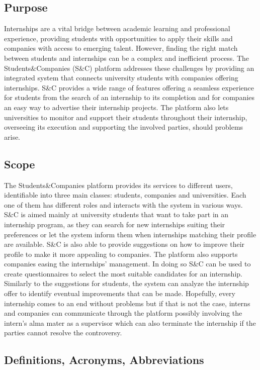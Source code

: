 \subsection{Purpose}
Internships are a vital bridge between academic learning and professional experience, providing students with opportunities to apply their skills and companies with access to emerging talent. However, finding the right match between students and internships can be a complex and inefficient process. The Students\&Companies (S\&C) platform addresses these challenges by providing an integrated system that connects university students with companies offering internships. S\&C provides a wide range of features offering a seamless experience for students from the search of an internship to its completion and for companies an easy way to advertise their internship projects. The platform also lets universities to monitor and support their students throughout their internship, overseeing its execution and supporting the involved parties, should problems arise.
\subsection{Scope}
The Students\&Companies platform provides its services to different users, identifiable into three main classes: students,  companies and universities. Each one of them has different roles and interacts with the system in various ways.
S\&C is aimed mainly at university students that want to take part in an internship program, as they can search for new internships suiting their preferences or let the system inform them when internships matching their profile are available. S\&C is also able to provide suggestions on how to improve their profile to make it more appealing to companies.
The platform also supports companies easing the internships’ management. In doing so S\&C can be used to create questionnaires to select the most suitable candidates for an internship. Similarly to the suggestions for students, the system can analyze the internship offer to identify eventual improvements that can be made.
Hopefully, every internship comes to an end without problems but if that is not the case, interns and companies can communicate through the platform possibly involving the intern’s alma mater as a supervisor which can also terminate the internship if the parties cannot resolve the controversy.

\subsection{Definitions, Acronyms, Abbreviations}
